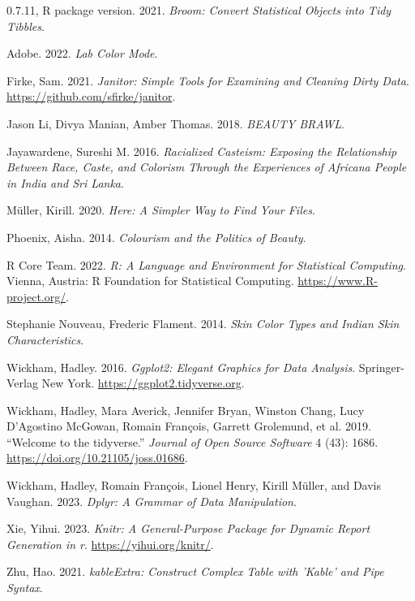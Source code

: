 \documentclass[
  letterpaper,
  DIV=11,
  numbers=noendperiod]{scrartcl}
\newlength{\cslhangindent}
\newlength{\cslentryspacingunit} %
\newenvironment{CSLReferences}[2] %
 {%
  \setlength{\parindent}{0pt}
  \ifodd #1
  \let\oldpar\par
  \def\par{\hangindent=\cslhangindent\oldpar}
  \fi
  \setlength{\parskip}{#2\cslentryspacingunit}
 }%
 {}
\begin{document}
\hypertarget{refs}{}
\begin{CSLReferences}{1}{0}
\leavevmode{}%
0.7.11, R package version. 2021. \emph{Broom: Convert Statistical
Objects into Tidy Tibbles}.

\leavevmode{}%
Adobe. 2022. \emph{Lab Color Mode}.

\leavevmode{}%
Firke, Sam. 2021. \emph{Janitor: Simple Tools for Examining and Cleaning
Dirty Data}. \url{https://github.com/sfirke/janitor}.

\leavevmode{}%
Jason Li, Divya Manian, Amber Thomas. 2018. \emph{BEAUTY BRAWL}.

\leavevmode{}%
Jayawardene, Sureshi M. 2016. \emph{Racialized Casteism: Exposing the
Relationship Between Race, Caste, and Colorism Through the Experiences
of Africana People in India and Sri Lanka}.

\leavevmode{}%
Müller, Kirill. 2020. \emph{Here: A Simpler Way to Find Your Files}.

\leavevmode{}%
Phoenix, Aisha. 2014. \emph{Colourism and the Politics of Beauty}.

\leavevmode{}%
R Core Team. 2022. \emph{R: A Language and Environment for Statistical
Computing}. Vienna, Austria: R Foundation for Statistical Computing.
\url{https://www.R-project.org/}.

\leavevmode{}%
Stephanie Nouveau, Frederic Flament. 2014. \emph{Skin Color Types and
Indian Skin Characteristics}.

\leavevmode{}%
Wickham, Hadley. 2016. \emph{Ggplot2: Elegant Graphics for Data
Analysis}. Springer-Verlag New York.
\url{https://ggplot2.tidyverse.org}.

\leavevmode{}%
Wickham, Hadley, Mara Averick, Jennifer Bryan, Winston Chang, Lucy
D'Agostino McGowan, Romain François, Garrett Grolemund, et al. 2019.
{``Welcome to the {tidyverse}.''} \emph{Journal of Open Source Software}
4 (43): 1686. \url{https://doi.org/10.21105/joss.01686}.

\leavevmode{}%
Wickham, Hadley, Romain François, Lionel Henry, Kirill Müller, and Davis
Vaughan. 2023. \emph{Dplyr: A Grammar of Data Manipulation}.

\leavevmode{}%
Xie, Yihui. 2023. \emph{Knitr: A General-Purpose Package for Dynamic
Report Generation in r}. \url{https://yihui.org/knitr/}.

\leavevmode{}%
Zhu, Hao. 2021. \emph{kableExtra: Construct Complex Table with 'Kable'
and Pipe Syntax}.

\end{CSLReferences}
\end{document}
